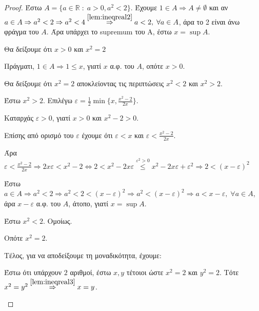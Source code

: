 \documentclass[main.tex]{subfiles}
\begin{document}
\begin{proof}
\item {}
  Έστω $ A = \{ a \in \mathbb{R} \; : \; a > 0, a^{2} < 2 \}  $. Έχουμε $ 1 \in A 
  \Rightarrow A \neq \emptyset $ 
  και αν $ a \in A \Rightarrow a^{2} < 2 \Rightarrow a^{2} < 4
  \overset{\ref{lem:ineqreal2}}{\Rightarrow} a <2,\; \forall a \in A $, 
  άρα το 2 είναι άνω φράγμα του $A$. Άρα υπάρχει το supremum του Α, έστω 
  $ x = \sup A $. 

  Θα δείξουμε ότι $ x > 0 $ και $ x^{2} = 2 $

  Πράγματι, $ 1 \in A \Rightarrow 1 \leq x $, γιατί $x$ α.φ. του $A$, οπότε $ x >0 $.

  Θα δείξουμε ότι $ x^{2} = 2 $ αποκλείοντας τις περιπτώσεις $ x^{2} <2 $ και 
  $ x^{2} > 2 $.
  \begin{myitemize}
    \item Έστω $ x^{2} > 2 $. Επιλέγω $ \varepsilon = \frac{1}{2} \min \{ x, 
      \frac{x^{2}-2}{2x}\} $.

      Καταρχάς $ \varepsilon > 0 $, γιατί $ x>0 $ και $ x^{2} -2 >0 $. 

      Επίσης από ορισμό του $ \varepsilon $ έχουμε ότι  $\varepsilon < x $ και 
      $ \varepsilon < \frac{x^{2}-2}{2x}$. 

      Άρα $ \varepsilon < \frac{x^{2}-2}{2x} \Rightarrow 
      2x \varepsilon < x^{2} - 2 \Leftrightarrow 2 < x^{2} -2x \varepsilon 
      \overset{\varepsilon ^{2}>0}{\leq}
      x^{2} -2x \varepsilon + \varepsilon ^{2} \Rightarrow 2 
      < (x- \varepsilon )^{2}   $

      Έστω $ a \in A \Rightarrow a^{2} <2 \Rightarrow a^{2}<2< 
      (x- \varepsilon )^{2} \Rightarrow a^{2}< (x- \varepsilon )^{2} 
      \Rightarrow a < x- \varepsilon, \; \forall a \in A$, 
      άρα $ x - \varepsilon $ α.φ. του $A$, άτοπο, γιατί $ x= \sup A $.

    \item Έστω $ x^{2}<2 $. Ομοίως.

      Οπότε $ x^{2}=2 $. 

      Τέλος, για να αποδείξουμε τη μοναδικότητα, έχουμε:

      Έστω ότι υπάρχουν $ 2 $ αριθμοί, έστω $ x,y $ τέτοιοι ώστε $ x^{2} =2 $ 
      και $ y^{2}=2 $. Τότε $ x^{2}=y^{2} \overset{\ref{lem:ineqreal3}}
      {\Rightarrow} x =y $.
  \end{myitemize}
\end{proof}

\end{document}
